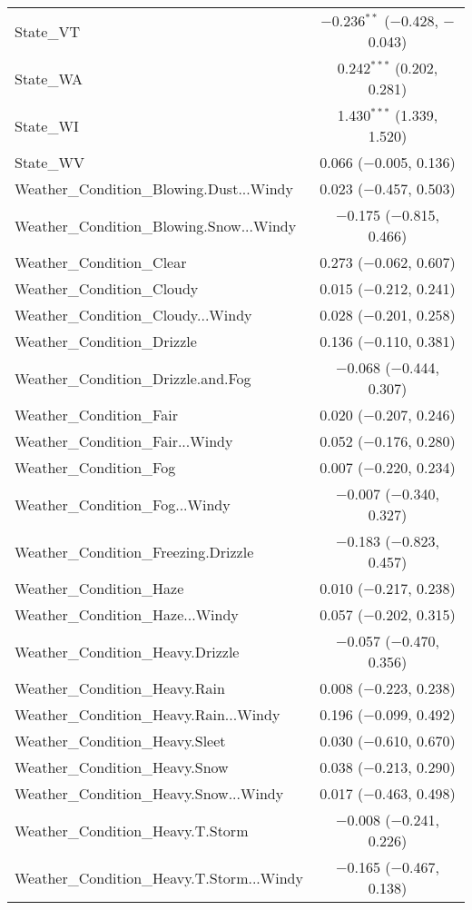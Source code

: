 \begin{table}[!htbp]
\begin{tabular}{@{\extracolsep{5pt}}lc}
  State\_VT & $-$0.236$^{**}$ ($-$0.428, $-$0.043) \\ 
  State\_WA & 0.242$^{***}$ (0.202, 0.281) \\ 
  State\_WI & 1.430$^{***}$ (1.339, 1.520) \\ 
  State\_WV & 0.066 ($-$0.005, 0.136) \\ 
  Weather\_Condition\_Blowing.Dust...Windy & 0.023 ($-$0.457, 0.503) \\ 
  Weather\_Condition\_Blowing.Snow...Windy & $-$0.175 ($-$0.815, 0.466) \\ 
  Weather\_Condition\_Clear & 0.273 ($-$0.062, 0.607) \\ 
  Weather\_Condition\_Cloudy & 0.015 ($-$0.212, 0.241) \\ 
  Weather\_Condition\_Cloudy...Windy & 0.028 ($-$0.201, 0.258) \\ 
  Weather\_Condition\_Drizzle & 0.136 ($-$0.110, 0.381) \\ 
  Weather\_Condition\_Drizzle.and.Fog & $-$0.068 ($-$0.444, 0.307) \\ 
  Weather\_Condition\_Fair & 0.020 ($-$0.207, 0.246) \\ 
  Weather\_Condition\_Fair...Windy & 0.052 ($-$0.176, 0.280) \\ 
  Weather\_Condition\_Fog & 0.007 ($-$0.220, 0.234) \\ 
  Weather\_Condition\_Fog...Windy & $-$0.007 ($-$0.340, 0.327) \\ 
  Weather\_Condition\_Freezing.Drizzle & $-$0.183 ($-$0.823, 0.457) \\ 
  Weather\_Condition\_Haze & 0.010 ($-$0.217, 0.238) \\ 
  Weather\_Condition\_Haze...Windy & 0.057 ($-$0.202, 0.315) \\ 
  Weather\_Condition\_Heavy.Drizzle & $-$0.057 ($-$0.470, 0.356) \\ 
  Weather\_Condition\_Heavy.Rain & 0.008 ($-$0.223, 0.238) \\ 
  Weather\_Condition\_Heavy.Rain...Windy & 0.196 ($-$0.099, 0.492) \\ 
  Weather\_Condition\_Heavy.Sleet & 0.030 ($-$0.610, 0.670) \\ 
  Weather\_Condition\_Heavy.Snow & 0.038 ($-$0.213, 0.290) \\ 
  Weather\_Condition\_Heavy.Snow...Windy & 0.017 ($-$0.463, 0.498) \\ 
  Weather\_Condition\_Heavy.T.Storm & $-$0.008 ($-$0.241, 0.226) \\ 
  Weather\_Condition\_Heavy.T.Storm...Windy & $-$0.165 ($-$0.467, 0.138) \\ 

\end{tabular}
\end{table}
